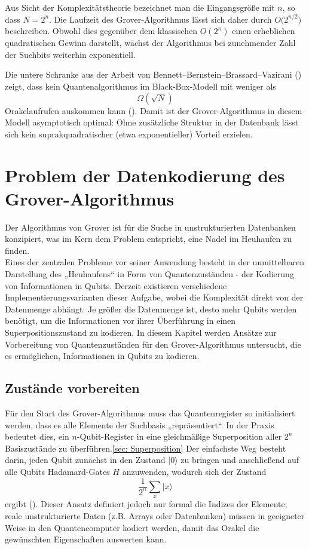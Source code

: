 Aus Sicht der Komplexitätstheorie bezeichnet man die Eingangsgröße mit \(n\), so dass $N = 2^n$.
Die Laufzeit des Grover‐Algorithmus lässt sich daher durch  
$O\bigl(2^{n/2}\bigr)$ beschreiben. Obwohl dies gegenüber dem klassischen \(O(2^n)\) einen erheblichen quadratischen Gewinn darstellt, wächst der Algorithmus bei zunehmender Zahl der Suchbits weiterhin exponentiell.

Die untere Schranke aus der Arbeit von Bennett–Bernstein–Brassard–Vazirani (\cite{zotero-1212}) zeigt, dass kein Quantenalgorithmus im Black‐Box‐Modell mit weniger als  
\[
\Omega(\sqrt{N})
\]  
Orakelaufrufen auskommen kann (\cite{zotero-1211}). Damit ist der Grover‐Algorithmus in diesem Modell asymptotisch optimal: Ohne zusätzliche Struktur in der Datenbank lässt sich kein suprakquadratischer (etwa exponentieller) Vorteil erzielen.  

\section{Problem der Datenkodierung des Grover-Algorithmus}
Der Algorithmus von Grover ist für die Suche in unstrukturierten Datenbanken konzipiert, was im Kern dem Problem entspricht, eine Nadel im Heuhaufen zu finden.\\

Eines der zentralen Probleme vor seiner Anwendung besteht in der unmittelbaren Darstellung des „Heuhaufens“ in Form von Quantenzuständen - der Kodierung von Informationen in Qubits. Derzeit existieren verschiedene Implementierungsvarianten dieser Aufgabe, wobei die Komplexität direkt von der Datenmenge abhängt: Je größer die Datenmenge ist, desto mehr Qubits werden benötigt, um die Informationen vor ihrer Überführung in einen Superpositionszustand zu kodieren. In diesem Kapitel werden Ansätze zur Vorbereitung von Quantenzuständen für den Grover-Algorithmus untersucht, die es ermöglichen, Informationen in Qubits zu kodieren.

\subsection{Zustände vorbereiten}
Für den Start des Grover-Algorithmus muss das Quantenregister so initialisiert werden, dass es alle Elemente der Suchbasis „repräsentiert“. In der Praxis bedeutet dies, ein \(n\)-Qubit-Register in eine gleichmäßige Superposition aller \(2^n\) Basiszustände zu überführen.\ref{sec: Superposition} Der einfachste Weg besteht darin, jeden Qubit zunächst in den Zustand \(\lvert 0\rangle\) zu bringen und anschließend auf alle Qubits Hadamard-Gates \(H\) anzuwenden, wodurch sich der Zustand  
\[
\frac{1}{2^{n}}\sum_{x}\lvert x\rangle
\]
ergibt (\cite{miguel_a_naranjo_review_2024}). Dieser Ansatz definiert jedoch nur formal die Indizes der Elemente; reale unstrukturierte Daten (z.B. Arrays oder Datenbanken) müssen in geeigneter Weise in den Quantencomputer kodiert werden, damit das Orakel die gewünschten Eigenschaften auswerten kann.

